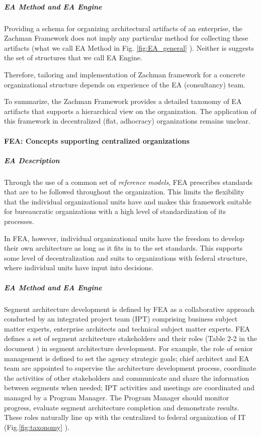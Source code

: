 \subparagraph*{EA Method and EA Engine}

Providing a schema for organizing architectural artifacts of an enterprise, the Zachman Framework does not imply any particular method for collecting these artifacts (what we call EA Method in Fig. \ref{fig:EA_general} ).
Neither is suggests the set of structures that we call EA Engine. 

Therefore, tailoring and  implementation of Zachman framework for a concrete organizational structure depends on experience of the EA (consultancy) team.

To summarize, the Zachman Framework provides a detailed taxonomy of EA artifacts that supports a hierarchical view on the organization. The application of this framework in decentralized (flat, adhocracy) organizations remains unclear.

\paragraph*{FEA: Concepts supporting centralized organizations}
\subparagraph*{EA Description}
Through the use of a common set of \textit{reference models}, FEA prescribes standards that are to be followed throughout the organization. This limits the flexibility that the individual organizational units have and makes this framework suitable for bureaucratic organizations with a high level of standardization of its processes.

In FEA, however, individual organizational units have the freedom to develop their own architecture as long as it fits in to the set standards. This supports some level of decentralization and suits to organizations with federal structure, where individual units have input into decisions. 

\subparagraph*{EA Method and EA Engine}

Segment architecture development is defined by FEA as a collaborative approach conducted by an integrated project team (IPT) comprising business subject matter experts, enterprise architects and technical subject matter experts.  FEA defines a set of segment architecture stakeholders and their roles (Table 2-2 in the document \cite{FEA_PMO2007} ) in segment architecture development.   For example, the role of senior management is defined to set the agency strategic goals; chief architect and EA team are appointed to supervise the architecture development process, coordinate the activities of other stakeholders and communicate and share the information between segments when needed; IPT activities and meetings are coordinated and managed by a Program Manager. The Program Manager should monitor progress, evaluate segment architecture completion and demonstrate results. These roles naturally line up with the centralized to federal organization of IT (Fig.\ref{fig:taxonomy} ).

